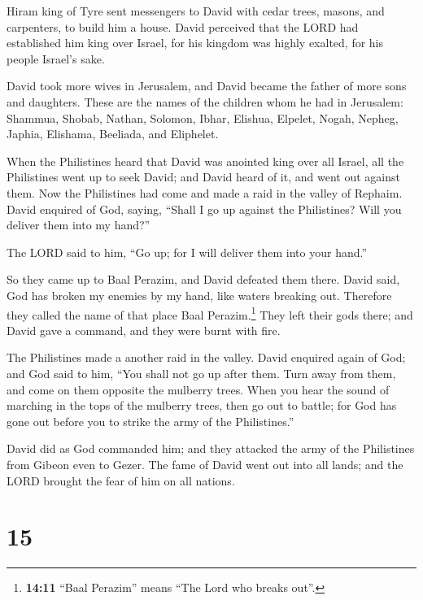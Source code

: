  Hiram king of Tyre sent messengers to David with cedar
trees, masons, and carpenters, to build him a house. 
David perceived that the LORD had established him king over Israel, for
his kingdom was highly exalted, for his people Israel's sake.

 David took more wives in Jerusalem, and David became the
father of more sons and daughters.  These are the names of
the children whom he had in Jerusalem: Shammua, Shobab, Nathan, Solomon,
 Ibhar, Elishua, Elpelet,  Nogah, Nepheg,
Japhia,  Elishama, Beeliada, and Eliphelet.

 When the Philistines heard that David was anointed king
over all Israel, all the Philistines went up to seek David; and David
heard of it, and went out against them.  Now the
Philistines had come and made a raid in the valley of Rephaim.
 David enquired of God, saying, ``Shall I go up against
the Philistines? Will you deliver them into my hand?''

The LORD said to him, ``Go up; for I will deliver them into your hand.''

 So they came up to Baal Perazim, and David defeated them
there. David said, God has broken my enemies by my hand, like waters
breaking out. Therefore they called the name of that place Baal
Perazim.\footnote{\textbf{14:11} ``Baal Perazim'' means ``The Lord who
  breaks out''.}  They left their gods there; and David
gave a command, and they were burnt with fire.

 The Philistines made a another raid in the valley.
 David enquired again of God; and God said to him, ``You
shall not go up after them. Turn away from them, and come on them
opposite the mulberry trees.  When you hear the sound of
marching in the tops of the mulberry trees, then go out to battle; for
God has gone out before you to strike the army of the Philistines.''

 David did as God commanded him; and they attacked the
army of the Philistines from Gibeon even to Gezer.  The
fame of David went out into all lands; and the LORD brought the fear of
him on all nations.

\hypertarget{section-14}{%
\section{15}\label{section-14}}

